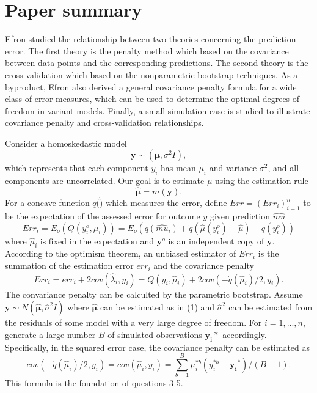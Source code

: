 \documentclass[12pt]{article}
\begin{document}
\section{Paper summary}
Efron studied the relationship between two theories concerning the prediction error. The first theory is the penalty method which based on the covariance between data points and the corresponding predictions. The second theory is the cross validation which based on the nonparametric bootstrap techniques. As a byproduct, Efron also derived a general covariance penalty formula for a wide class of error measures, which can be used to determine the optimal degrees of freedom in variant models. Finally, a small simulation case is studied to illustrate covariance penalty and cross-validation relationships. 

Consider a homoskedastic model
\[
\bm{y}\sim (\bm{\mu},\sigma^2 I),
\]
which represents that each component $y_i$ has mean $\mu_i$ and variance $\sigma^2$, and all components are uncorrelated. Our goal is to estimate $\mu$ using the estimation rule
\begin{equation}
\widehat{\bm{\mu}}=m(\bm{y}).
\end{equation}
For a concave function $q(\dot)$ which measures the error, define $Err=(Err_i)_{i=1}^{n}$ to be the expectation of the assessed error for outcome $y$ given prediction $\widehat{mu}$
\[
Err_i=E_{o}(Q(y_i^o,\widehat{\mu}_i))=E_{o}(q(\widehat{mu}_i)+\dot{q}(\widehat{\mu}(y_i^o)-\widehat{\mu})-q(y_i^o))
\]
where $\widehat{\mu}_i$ is fixed in the expectation and $\bm{y}^o$ is an independent copy of $\bm{y}$. According to the optimism theorem, an unbiased estimator of $Err_i$ is the summation of the estimation error $err_i$ and the covariance penalty
\[
Err_i=err_i+2cov(\widehat{\lambda}_i,y_i)=Q(y_i,\widehat{\mu}_i)+2cov(-\dot{q}(\widehat{\mu}_i)/2,y_i).
\]
The convariance penalty can be calculted by the parametric bootstrap. Assume $\bm{y}\sim N(\widehat{\bm{\mu}},\widehat{\sigma}^2I)$ where $\widehat{\bm{\mu}}$ can be estimated as in (1) and $\widehat{\sigma}^2$ can be estimated from the residuals of some model with a very large degree of freedom. For $i=1,...,n$, generate a large number $B$ of simulated observations $\bm{y_i}*$ accordingly. Specifically, in the squared error case, the covariance penalty can be estimated as
\begin{equation}
cov(-\dot{q}(\widehat{\mu}_i)/2,y_i)=cov(\widehat{\mu}_i,y_i)=\sum_{b=1}^{B}\mu_i^{*b}(y_i^{*b}-\bar{\bm{y_i}^{*}})/(B-1).
\end{equation}
This formula is the foundation of questions 3-5.
\end{document}

